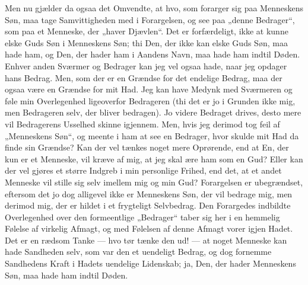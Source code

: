 \documentclass[12pt,a4paper]{book}
\begin{document}
Men nu gjælder da ogsaa det Omvendte, at hvo, som forarger sig paa Menneskens Søn, maa
tage Samvittigheden med
i Forargelsen, og see paa „denne Bedrager“, som paa et Menneske, der „haver Djævlen“.
Det er forfærdeligt, ikke at kunne elske Guds Søn i Menneskens Søn; thi Den, der ikke
kan elske Guds Søn, maa hade ham, og Den, der hader ham i Aandens Navn, maa hade ham
indtil Døden. Enhver anden Sværmer og Bedrager kan jeg vel ogsaa hade, naar jeg opdager
hans Bedrag. Men, som der er en Grændse for det endelige Bedrag, maa der ogsaa være en
Grændse for mit Had. Jeg kan have Medynk med Sværmeren og føle min Overlegenhed
ligeoverfor Bedrageren (thi det er jo i Grunden ikke mig, men Bedrageren selv, der
bliver bedragen). Jo videre Bedraget drives, desto mere vil Bedragerens Usselhed skinne
igjennem. Men, hvis jeg derimod tog feil af „Menneskens Søn“, og meente i ham at see en
Bedrager, hvor skulde mit Had da finde sin Grændse? Kan der vel tænkes noget mere
Oprørende, end at En, der kun er et Menneske, vil kræve af mig, at jeg skal ære ham som
en Gud? Eller kan der vel gjøres et større Indgreb i min personlige Frihed, end det, at
et andet Menneske vil stille sig selv imellem mig og min Gud? Forargelsen er
ubegrændset, eftersom det jo dog alligevel ikke er Menneskens Søn, der vil bedrage mig,
men derimod mig, der er hildet i et frygteligt Selvbedrag. Den Forargedes indbildte
Overlegenhed over den formeentlige „Bedrager“ taber sig her i en hemmelig Følelse af
virkelig Afmagt, og med Følelsen af denne Afmagt vorer igjen Hadet. Det er en rædsom
Tanke --- hvo tør tænke den ud! --- at noget Menneske kan hade Sandheden selv, som var
den et uendeligt Bedrag, og dog fornemme Sandhedens Kraft i Hadets uendelige Lidenskab;
ja, Den, der hader Menneskens Søn, maa hade ham indtil Døden.
\end{document}
